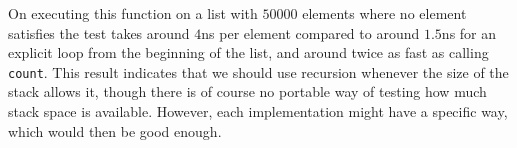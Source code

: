 On \sbcl{} executing this function on a list with $50000$ elements
where no element satisfies the test takes around $4$ns per element
compared to around $1.5$ns for an explicit loop from the beginning of
the list, and around twice as fast as calling \texttt{count}.%
  This result indicates that we should use
recursion whenever the size of the stack allows it, though there is of
course no portable way of testing how much stack space is available.
However, each implementation might have a specific way, which would
then be good enough.
